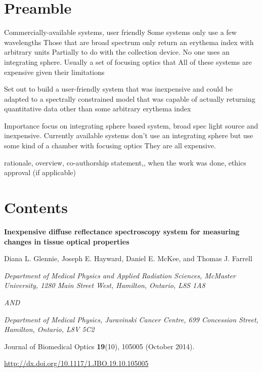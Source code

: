\section*{Preamble}

Commercially-available systems, user friendly
Some systems only use a few wavelengths
Those that are broad spectrum only return an erythema index with arbitrary units
Partially to do with the collection device. No one uses an integrating sphere. Usually a set of focusing optics that 
All of these systems are expensive given their limitations

Set out to build a user-friendly system that was inexpensive and could be adapted to a spectrally constrained model that was capable of actually returning quantitative data other than some arbitrary erythema index

Importance focus on integrating sphere based system, broad spec light source and inexpensive.
Currently available systems don't use an integrating sphere but use some kind of a chamber with focusing optics 
They are all expensive.

rationale, overview, co-authorship statement,, when the work was done, ethics approval (if applicable)

\section*{Contents}

\begin{center}

\textbf{Inexpensive diffuse reflectance spectroscopy system for measuring changes in tissue optical properties}

Diana L. Glennie, Joseph E. Hayward, Daniel E. McKee, and Thomas J. Farrell

\textit{Department of Medical Physics and Applied Radiation Sciences, McMaster University, 1280 Main Street West, Hamilton, Ontario, L8S 1A8}

\textit{AND}

\textit{Department of Medical Physics, Juravinski Cancer Centre, 699 Concession Street, Hamilton, Ontario, L8V 5C2}

\end{center}

\noindent Journal of Biomedical Optics \textbf{19}(10), 105005 (October 2014).

\noindent \url{http://dx.doi.org/10.1117/1.JBO.19.10.105005}

